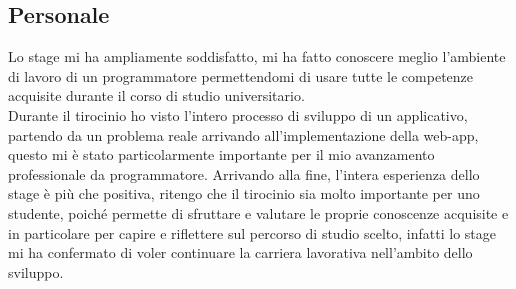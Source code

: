 \subsection{Personale}
Lo stage mi ha ampliamente soddisfatto, mi ha fatto conoscere meglio l'ambiente di lavoro di un programmatore permettendomi di usare tutte le competenze acquisite durante il corso di studio universitario.\\
Durante il tirocinio ho visto l'intero processo di sviluppo di un applicativo, partendo da un problema reale arrivando all'implementazione della web-app, questo mi è stato particolarmente importante per il mio avanzamento professionale da programmatore.
Arrivando alla fine, l'intera esperienza dello stage è più che positiva, ritengo che il tirocinio sia molto importante per uno studente, poiché permette di sfruttare e valutare le proprie conoscenze acquisite e in particolare per capire e riflettere sul percorso di studio scelto, infatti lo stage mi ha confermato di voler continuare la carriera lavorativa nell'ambito dello sviluppo.